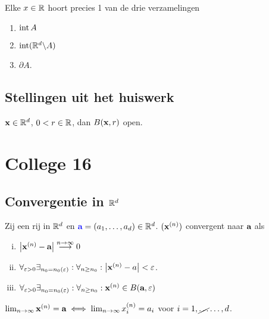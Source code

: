 \documentclass{2wa40summary}
\begin{document}
\begin{lemma}
Elke $x \in \mathbb{R}$ hoort precies  1  van de drie verzamelingen
\begin{enumerate}
\item $\operatorname{\mathop{int}} A$
\item $\operatorname{\mathop{int}} (\mathbb{R}^d\backslash A)$
\item $\partial A$.
\end{enumerate}
\end{lemma}
  	\subsection{Stellingen uit het huiswerk}
\begin{theorem}
${\textbf{x}} \in \mathbb{R}^d$, $0<r\in\mathbb{R}$, dan  $B({\textbf{x}},r)$ open.
\end{theorem}
\newpage
\section{College 16}
	\subsection{Convergentie in $\mathbb{R}^d$}
\begin{define}
Zij 
een rij in $\mathbb{R}^d$\cancel{,} en ${\color{blue}{\textbf{a}}} =(a_1, \dots ,a_d ) \in \mathbb{R}^d$.  $({\textbf{x}}^{(n)})$ convergent naar ${\textbf{a}}$ als
			\begin{enumerate}[(i)]
				\item ${\left|{\textbf{x}}^{(n)}-{\textbf{a}}\right|}\stackrel{n\rightarrow \infty}{\longrightarrow} 0$
				\item $\forall _{\varepsilon >0} \exists _{n_0=n_0(\varepsilon)}: \forall _{n\geq n_0} : {\left|{\textbf{x}}^{(n)} - a\right|} < \varepsilon$.
				\item $\forall _{\varepsilon >0} \exists _{n_0=n_0(\varepsilon)}: \forall _{n\geq n_0} : {\textbf{x}}^{(n)} \in B({\textbf{a}},\varepsilon )$
			\end{enumerate}
\end{define}		
\begin{theorem}
$\lim_{n\rightarrow\infty}{\textbf{x}}^{(n)}={\textbf{a}} \iff \lim_{n\to\infty} x^{(n)}_{i} = a_i$ voor  $i=1,\cancel{\dots}\ldots ,d$.
\end{theorem}
		
\end{document}
